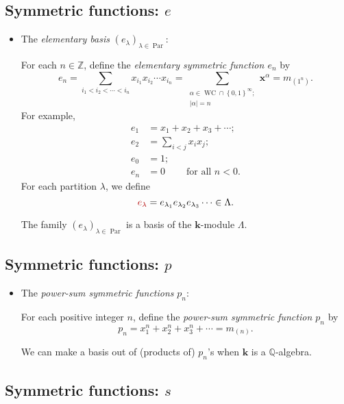 \documentclass[numbers=enddot,12pt,final,onecolumn,notitlepage]{scrartcl}%
\newcommand{\defn}[1]{{\color{darkred}\emph{#1}}}
\newcommand{\defnm}[1]{{\color{darkred} #1}}
\newcommand{\0}{\phantom{c}}
\let\sumnonlimits\sum
\renewcommand{\sum}{\sumnonlimits\limits}
\begin{document}
\subsection{Symmetric functions: $e$}

\begin{itemize}
\item The \defn{elementary basis} $\left(  e_{\lambda}\right)  _{\lambda
\in\operatorname*{Par}}$:

For each $n\in\mathbb{Z}$, define the \defn{elementary symmetric function
$e_{n}$} by%
\[
e_{n}=\sum_{i_{1}<i_{2}<\cdots<i_{n}}x_{i_{1}}x_{i_{2}}\cdots x_{i_{n}}%
=\sum_{\substack{\alpha\in\operatorname*{WC}\cap\left\{  0,1\right\}
^{\infty};\\\left\vert \alpha\right\vert =n}}\mathbf{x}^{\alpha}=m_{\left(
1^{n}\right)  }.
\]
For example,%
\begin{align*}
e_{1}  &  =x_{1}+x_{2}+x_{3}+\cdots;\\
e_{2}  &  =\sum_{i<j}x_{i}x_{j};\\
e_{0}  &  =1;\\
e_{n}  &  =0\ \ \ \ \ \ \ \ \ \ \text{for all }n<0.
\end{align*}
For each partition $\lambda$, we define
\[
\defnm{e_{\lambda}}=e_{\lambda_{1}}e_{\lambda_{2}}e_{\lambda_{3}}\cdots
\in\Lambda.
\]


The family $\left(  e_{\lambda}\right)  _{\lambda\in\operatorname*{Par}}$ is a
basis of the $\mathbf{k}$-module $\Lambda$.
\end{itemize}

\subsection{Symmetric functions: $p$}

\begin{itemize}
\item The \defn{power-sum symmetric functions} $p_{n}$:

For each positive integer $n$, define the \defn{power-sum symmetric function
$p_{n}$} by%
\[
p_{n}=x_{1}^{n}+x_{2}^{n}+x_{3}^{n}+\cdots=m_{\left(  n\right)  }.
\]


We can make a basis out of (products of) $p_{n}$'s when $\mathbf{k}$ is a
$\mathbb{Q}$-algebra.
\end{itemize}

\subsection{Symmetric functions: $s$}
\end{document}
